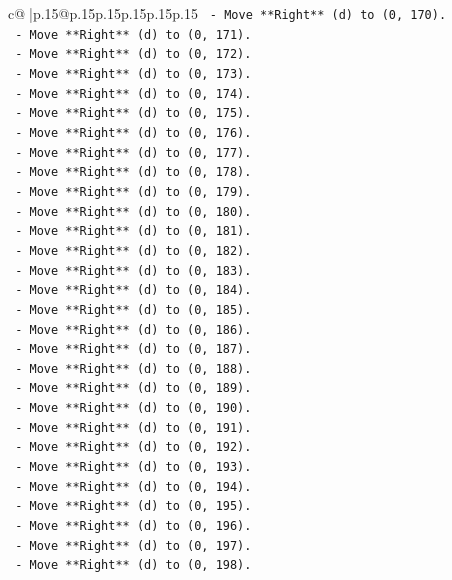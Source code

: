 \documentclass{article}
\begin{document}
{\begin{supertabular}{c@{$\;$}|p{.15\linewidth}@{}p{.15\linewidth}p{.15\linewidth}p{.15\linewidth}p{.15\linewidth}p{.15\linewidth}}
{{{\texttt{    {-} Move **Right** (d) to (0, 170).} \\
\texttt{    {-} Move **Right** (d) to (0, 171).} \\
\texttt{    {-} Move **Right** (d) to (0, 172).} \\
\texttt{    {-} Move **Right** (d) to (0, 173).} \\
\texttt{    {-} Move **Right** (d) to (0, 174).} \\
\texttt{    {-} Move **Right** (d) to (0, 175).} \\
\texttt{    {-} Move **Right** (d) to (0, 176).} \\
\texttt{    {-} Move **Right** (d) to (0, 177).} \\
\texttt{    {-} Move **Right** (d) to (0, 178).} \\
\texttt{    {-} Move **Right** (d) to (0, 179).} \\
\texttt{    {-} Move **Right** (d) to (0, 180).} \\
\texttt{    {-} Move **Right** (d) to (0, 181).} \\
\texttt{    {-} Move **Right** (d) to (0, 182).} \\
\texttt{    {-} Move **Right** (d) to (0, 183).} \\
\texttt{    {-} Move **Right** (d) to (0, 184).} \\
\texttt{    {-} Move **Right** (d) to (0, 185).} \\
\texttt{    {-} Move **Right** (d) to (0, 186).} \\
\texttt{    {-} Move **Right** (d) to (0, 187).} \\
\texttt{    {-} Move **Right** (d) to (0, 188).} \\
\texttt{    {-} Move **Right** (d) to (0, 189).} \\
\texttt{    {-} Move **Right** (d) to (0, 190).} \\
\texttt{    {-} Move **Right** (d) to (0, 191).} \\
\texttt{    {-} Move **Right** (d) to (0, 192).} \\
\texttt{    {-} Move **Right** (d) to (0, 193).} \\
\texttt{    {-} Move **Right** (d) to (0, 194).} \\
\texttt{    {-} Move **Right** (d) to (0, 195).} \\
\texttt{    {-} Move **Right** (d) to (0, 196).} \\
\texttt{    {-} Move **Right** (d) to (0, 197).} \\
\texttt{    {-} Move **Right** (d) to (0, 198).} \\
}}}
\end{supertabular}}
\end{document}
